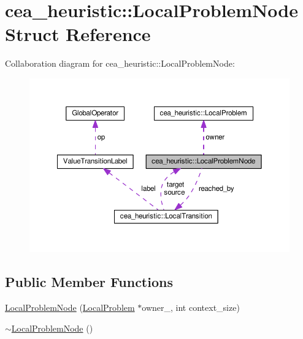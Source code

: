 \hypertarget{structcea__heuristic_1_1LocalProblemNode}{\section{cea\-\_\-heuristic\-:\-:Local\-Problem\-Node Struct Reference}
\label{structcea__heuristic_1_1LocalProblemNode}
}


Collaboration diagram for cea\-\_\-heuristic\-:\-:Local\-Problem\-Node\-:
\nopagebreak
\begin{figure}[H]
\begin{center}
\leavevmode
\includegraphics[width=350pt]{structcea__heuristic_1_1LocalProblemNode__coll__graph}
\end{center}
\end{figure}
\subsection*{Public Member Functions}
\begin{DoxyCompactItemize}
\item 
\hyperlink{structcea__heuristic_1_1LocalProblemNode_a382436a05dfb4d2daa880cfba3141e8e}{Local\-Problem\-Node} (\hyperlink{structcea__heuristic_1_1LocalProblem}{Local\-Problem} $\ast$owner\-\_\-, int context\-\_\-size)
\item 
\hyperlink{structcea__heuristic_1_1LocalProblemNode_ab1ac36e9a9d0f516282928cbbc73c16c}{$\sim$\-Local\-Problem\-Node} ()
\end{DoxyCompactItemize}
